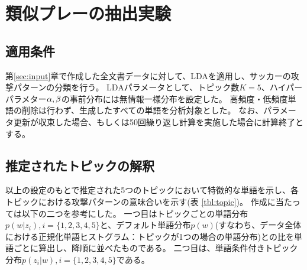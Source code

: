 \section{類似プレーの抽出実験}
\label{sec:exp}

\subsection{適用条件}
第\ref{sec:input}章で作成した全文書データに対して、LDAを適用し、サッカーの攻撃パターンの分類を行う。
LDAパラメータとして、トピック数$K=5$、ハイパーパラメター$\bf{\alpha},\bf{\beta}$の事前分布には無情報一様分布を設定した。
高頻度・低頻度単語の削除は行わず、生成したすべての単語を分析対象とした。
なお、パラメータ更新が収束した場合、もしくは50回繰り返し計算を実施した場合に計算終了とする。

\subsection{推定されたトピックの解釈}
以上の設定のもとで推定された5つのトピックにおいて特徴的な単語を示し、各トピックにおける攻撃パターンの意味合いを示す(表 \ref{tbl:topic})。
作成に当たっては以下の二つを参考にした。
一つ目はトピックごとの単語分布$p(w|z_i),i=\{1,2,3,4,5\}$と、デフォルト単語分布$p(w)$(すなわち、データ全体における正規化単語ヒストグラム：トピックが1つの場合の単語分布)との比を単語ごとに算出し、降順に並べたものである。
二つ目は、単語条件付きトピック分布$p(z_i|w),i=\{1,2,3,4,5\}$である。

